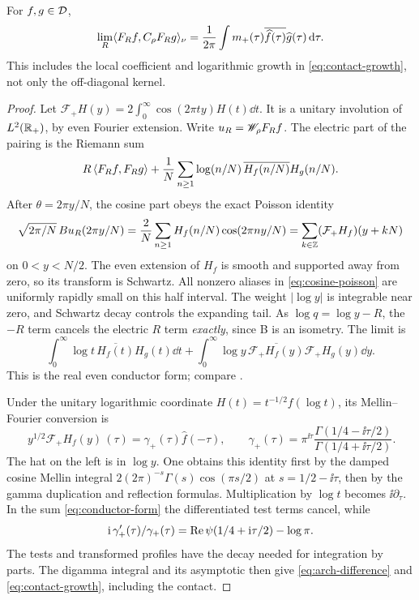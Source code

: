 \begin{theorem}\label{thm:arch}
For $f,g\in\mathcal D$,
\begin{equation}\label{eq:arch-mixed-limit}
\lim_R\langle F_Rf,C_\rho F_Rg\rangle_\nu
=\frac1{2\pi}\int m_+(\tau)
                 \overline{\widehat f(\tau)}\widehat g(\tau)\,\mathrm d\tau.
\end{equation}
This includes the local coefficient and logarithmic growth in
\eqref{eq:contact-growth}, not only the off-diagonal kernel.
\end{theorem}
\begin{proof}
Let $\mathcal F_+H(y)=2\int_0^\infty\cos(2\pi ty)H(t)\dd t$.
It is a unitary involution of $L^2(\mathbb R_+)$, by even Fourier
extension. Write $u_R=\mathscr W_\rho F_Rf$.
The electric part of the pairing is the Riemann sum
\[
R\,\langle F_Rf,F_Rg\rangle
+\frac1N\sum_{n\ge1}\log(n/N)\,
                       \overline{H_f(n/N)}H_g(n/N).
\]
After $\theta=2\pi y/N$, the cosine part obeys the exact Poisson
identity
\begin{equation}\label{eq:cosine-poisson}
\sqrt{2\pi/N}\,Bu_R(2\pi y/N)
=\frac2N\sum_{n\ge1}H_f(n/N)\cos(2\pi ny/N)
=\sum_{k\in\mathbb Z}(\mathcal F_+H_f)(y+kN)
\end{equation}
on $0<y<N/2$. The even extension of $H_f$ is smooth and supported
away from zero, so its transform is Schwartz. All nonzero aliases
in \eqref{eq:cosine-poisson} are uniformly rapidly small on this
half interval. The weight $|\log y|$ is integrable near zero,
and Schwartz decay controls the expanding tail.
As $\log q=\log y-R$, the $-R$ term cancels the electric $R$
term \emph{exactly}, since B is an isometry. The limit is
\begin{equation}\label{eq:conductor-form}
\int_0^\infty\log t\,\overline{H_f(t)}H_g(t)\dd t+
\int_0^\infty\log y\,
\overline{\mathcal F_+H_f(y)}\mathcal F_+H_g(y)\dd y .
\end{equation}
This is the real even conductor form; compare \cite{burnol}.

Under the unitary logarithmic coordinate $H(t)=t^{-1/2}f(\log t)$,
its Mellin--Fourier conversion is
\[
\widehat{\,y^{1/2}\mathcal F_+H_f(y)\,}(\tau)
=\gamma_+(\tau)\widehat f(-\tau),\qquad
\gamma_+(\tau)=\pi^{\ii\tau}
\frac{\Gamma(1/4-\ii\tau/2)}{\Gamma(1/4+\ii\tau/2)} .
\]
The hat on the left is in $\log y$. One obtains this identity
first by the damped cosine Mellin integral
$2(2\pi)^{-s}\Gamma(s)\cos(\pi s/2)$ at $s=1/2-\ii\tau$,
then by the gamma duplication and reflection formulas.
Multiplication by $\log t$ becomes $\ii\partial_\tau$.
In the sum \eqref{eq:conductor-form} the differentiated test
terms cancel, while
\begin{equation}
\mathrm i\,\gamma_+'(\tau)/\gamma_+(\tau)
=\operatorname{Re}\psi(1/4+\mathrm i\tau/2)-\log\pi .
\end{equation}
The tests and transformed profiles have the decay needed for
integration by parts. The digamma integral and its asymptotic
then give \eqref{eq:arch-difference} and
\eqref{eq:contact-growth}, including the contact.
\end{proof}
